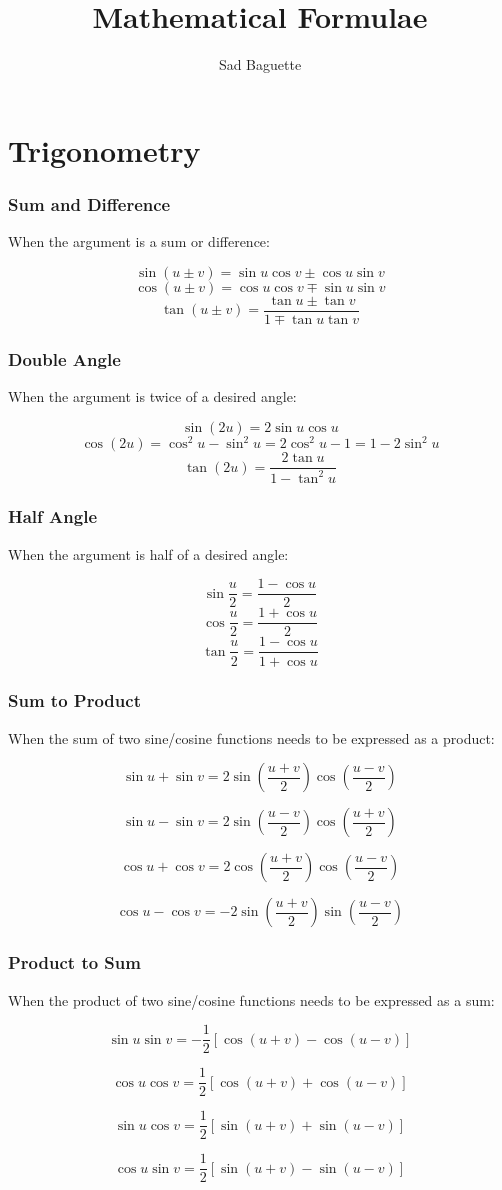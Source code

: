 \documentclass{article}
\title{Mathematical Formulae}
\author{Sad Baguette}
\date{}
\begin{document}
\maketitle


\part{Trigonometry}
\section{Sum and Difference}
When the argument is a sum or difference:

\[ \sin(u \pm v) = \sin{u} \cos{v} \pm \cos{u} \sin{v} \]
\[ \cos(u \pm v) = \cos{u} \cos{v} \mp \sin{u} \sin{v} \]
\[ \tan(u \pm v) = \frac{\tan{u} \pm \tan{v}}{1 \mp \tan{u} \tan{v}} \]

\section{Double Angle}
When the argument is twice of a desired angle:

\[ \sin(2u) = 2 \sin{u} \cos{u} \]
\[ \cos(2u) = \cos^2{u} - \sin^2{u} = 2\cos^2{u} - 1 = 1 - 2\sin^2{u} \]
\[ \tan(2u) = \frac{2\tan{u}}{1-\tan^2{u}} \]

\section{Half Angle}
When the argument is half of a desired angle:

\[ \sin{\frac{u}{2}} = \frac{1-\cos{u}}{2} \]
\[ \cos{\frac{u}{2}} = \frac{1+\cos{u}}{2} \]
\[ \tan{\frac{u}{2}} = \frac{1-\cos{u}}{1+\cos{u}} \]

\section{Sum to Product}
When the sum of two sine/cosine functions needs to be expressed as a product:

\[ \sin{u} + \sin{v} = 2\sin\left(\frac{u+v}{2}\right)\cos\left(\frac{u-v}{2}\right) \]

\[ \sin{u} - \sin{v} = 2\sin\left(\frac{u-v}{2}\right)\cos\left(\frac{u+v}{2}\right) \]

\[ \cos{u} + \cos{v} = 2\cos\left(\frac{u+v}{2}\right) \cos\left(\frac{u-v}{2}\right) \]

\[ \cos{u} - \cos{v} = -2\sin\left(\frac{u+v}{2}\right)\sin\left(\frac{u-v}{2}\right) \]

\section{Product to Sum}
When the product of two sine/cosine functions needs to be expressed as a sum: 

\[ \sin{u}\sin{v} = -\frac{1}{2}[\cos(u+v)-\cos(u-v)] \]

\[ \cos{u}\cos{v} = \frac{1}{2}[\cos(u+v)+\cos(u-v)] \]

\[ \sin{u}\cos{v} = \frac{1}{2}[\sin(u+v)+\sin(u-v)] \]

\[ \cos{u}\sin{v} = \frac{1}{2}[\sin(u+v)-\sin(u-v)] \]
\end{document}
